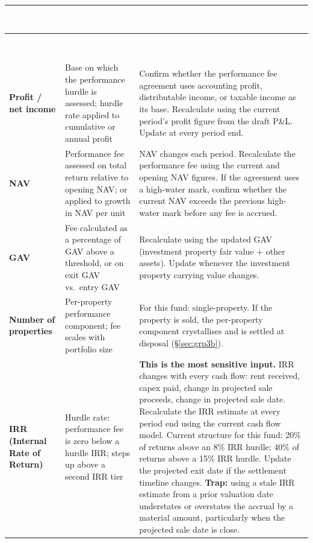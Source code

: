 \documentclass[10pt,a4paper]{article}
\begin{document}
{\small\sffamily
\begin{longtable}{@{} L{3.0cm} L{2.2cm} L{7.5cm} @{}}
\textcolor{white}{\bfseries Input / Metric} & \textcolor{white}{\bfseries Role in Calculation} & \textcolor{white}{\bfseries Procedure \& Traps} \\
\midrule
\endfirsthead
{}\textcolor{white}{\bfseries Input / Metric} & \textcolor{white}{\bfseries Role in Calculation} & \textcolor{white}{\bfseries Procedure \& Traps} \\
\midrule
\endhead
\textbf{Profit / net income} & Base on which the performance hurdle is assessed; hurdle rate applied to cumulative or annual profit & Confirm whether the performance fee agreement uses accounting profit, distributable income, or taxable income as its base. Recalculate using the current period's profit figure from the draft P\&L. Update at every period end. \\
\textbf{NAV} & Performance fee assessed on total return relative to opening NAV; or applied to growth in NAV per unit & NAV changes each period. Recalculate the performance fee using the current and opening NAV figures. If the agreement uses a high-water mark, confirm whether the current NAV exceeds the previous high-water mark before any fee is accrued. \\
\textbf{GAV} & Fee calculated as a percentage of GAV above a threshold, or on exit GAV vs.\ entry GAV & Recalculate using the updated GAV (investment property fair value + other assets). Update whenever the investment property carrying value changes. \\
\textbf{Number of properties} & Per-property performance component; fee scales with portfolio size & For this fund: single-property. If the property is sold, the per-property component crystallises and is settled at disposal (\S\ref{sec:grp3b}). \\
\textbf{IRR (Internal Rate of Return)} & Hurdle rate: performance fee is zero below a hurdle IRR; steps up above a second IRR tier & \textbf{This is the most sensitive input.} IRR changes with every cash flow: rent received, capex paid, change in projected sale proceeds, change in projected sale date. Recalculate the IRR estimate at every period end using the current cash flow model. Current structure for this fund: 20\% of returns above an 8\% IRR hurdle; 40\% of returns above a 15\% IRR hurdle. Update the projected exit date if the settlement timeline changes. \textbf{Trap:} using a stale IRR estimate from a prior valuation date understates or overstates the accrual by a material amount, particularly when the projected sale date is close. \\

\end{longtable}}
\end{document}
